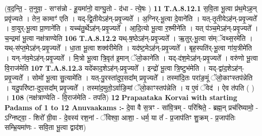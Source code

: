 \documentclass[17pt]{extarticle}
\begin{document}
                                                        (व॒द॒न्ति॒ - त॒नुवा॒ - सꣳस॑न्नो - हू॒यमा॑नो॒ वाग्घु॒तो - द॑धा - त्ये॒षः ) \textbf{11} \newline \newline
                                \textbf{ T.A.8.12.1} \newline
                  स॒वि॒ता भू॒त्वा प्र॑थ॒मेऽह॒न् प्रवृ॑ज्यते । तेन॒ कामाꣳ॑ एति । यद्-द्वि॒तीयेऽह॑न्-प्रवृ॒ज्यते᳚ । अ॒ग्निर्-भू॒त्वा दे॒वाने॑ति । यत्-तृ॒तीयेऽह॑न्-प्रवृ॒ज्यते᳚ । वा॒युर्-भू॒त्वा प्रा॒णाने॑ति । यच्च॑तु॒र्थेऽह॑न्-प्रवृ॒ज्यते᳚ । आ॒दि॒त्यो भू॒त्वा र॒श्मीने॑ति । यत् प॑ञ्च॒मेऽह॑न्-प्रवृ॒ज्यते᳚ । च॒न्द्रमा॑ भू॒त्वा नक्ष॑त्राण्येति \textbf{ 106} \newline
                  \newline
                                                                  \textbf{ T.A.8.12.2} \newline
                  यथ्-ष॒ष्ठेऽह॑न्-प्रवृ॒ज्यते᳚ । ऋ॒तुर्-भू॒त्वा स॑म्ॅवथ्स॒रमे॑ति । यथ्-स॑प्त॒मेऽह॑न्-प्रवृ॒ज्यते᳚ । धा॒ता भू॒त्वा शक्व॑रीमेति । यद॑ष्ट॒मेऽह॑न्-प्रवृ॒ज्यते᳚ । बृह॒स्पति॑र्-भू॒त्वा गा॑य॒त्रीमे॑ति ।  यन्-न॑व॒मेऽह॑न्-प्रवृ॒ज्यते᳚ । मि॒त्रो भू॒त्वा त्रि॒वृत॑ इ॒मान् ॅलो॒काने॑ति । यद्-द॑श॒मेऽह॑न्-प्रवृ॒ज्यते᳚ । वरु॑णो भू॒त्वा वि॒राज॑मेति \textbf{ 107} \newline
                  \newline
                                                                  \textbf{ T.A.8.12.3} \newline
                  यदे॑काद॒शेऽह॑न्-प्रवृ॒ज्यते᳚ । इन्द्रो॑ भू॒त्वा त्रि॒ष्टुभ॑मेति । यद्-द्वा॑द॒शेऽह॑न्-प्रवृ॒ज्यते᳚ । सोमो॑ भू॒त्वा सु॒त्यामे॑ति । यत्-पु॒रस्ता॑दुप॒सदा᳚म् प्रवृ॒ज्यते᳚ । तस्मा॑दि॒तः परा॑ङ॒मूं ॅलो॒काꣳस्तप॑न्नेति । यदु॒परि॑ष्टा-दुप॒सदा᳚म् प्रवृ॒ज्यते᳚ । तस्मा॑द॒मुतो॒ऽर्वाङि॒मां ॅलो॒काꣳस्तप॑न्नेति । य ए॒वं ॅवेद॑ ।  ऐव त॑पति ( ) । \textbf{ 108} \newline
                  \newline
                                                        (नक्ष॑त्राण्येति - वि॒राज॑मेति - तपति) \textbf{12} \newline \newline
\textbf{Prapaataka Korvai with starting Padams of 1 to 12 Anuvaakams :-} \newline
दे॒वा वै स॒त्रꣳ - सा॑वि॒त्रम् - परि॑श्रिते॒ - ब्रह्म॒न् प्रच॑रिष्यामो॒ - ऽग्निष्ट्वा॒ - शिरो᳚ ग्री॒वा - दे॒वस्य॑ रश॒नां - ॅविश्वा॒ आशा॒ - धर्म॒ या त᳚ - प्र॒जाप॑तिꣳ शु॒क्रम् - प्र॒जाप॑तिः सम्भ्रि॒यमा॑णः - सवि॒ता भू॒त्वा द्वाद॑श) \newline
\end{document}

